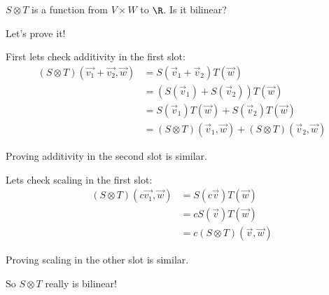 \documentclass{ximera}
\begin{document}
\begin{question}
  $S \otimes T$ is a function from $V \times W$ to $\R$.  Is it bilinear?

  \begin{solution}
    \begin{multiple-choice}
    \end{multiple-choice}
  \end{solution}

  Let's prove it!
  
  \begin{free-response}
    First lets check additivity in the first slot:
    \begin{align*}
      (S \otimes T)(\vec{v_1}+\vec{v_2},\vec{w}) &= S(\vec{v}_1+\vec{v}_2)T(\vec{w})\\
      &= \left(S(\vec{v}_1) +S(\vec{v}_2)\right)T(\vec{w})\\
      &=S(\vec{v}_1)T(\vec{w})+S(\vec{v}_2)T(\vec{w})\\
      &=(S\otimes T)(\vec{v}_1,\vec{w})+(S\otimes T)(\vec{v}_2,\vec{w})
    \end{align*}
    
    Proving additivity in the second slot is similar.
    
    Lets check scaling in the first slot:
    \begin{align*}
      (S \otimes T)(c\vec{v_1},\vec{w}) &= S(c\vec{v})T(\vec{w})\\
      &= cS(\vec{v})T(\vec{w})\\
      &=c(S\otimes T)(\vec{v},\vec{w})
    \end{align*}
    
    Proving scaling in the other slot is similar.
    
    So $S \otimes T$ really is bilinear!
    
  \end{free-response}	
  
\end{question}

	
\end{document}
